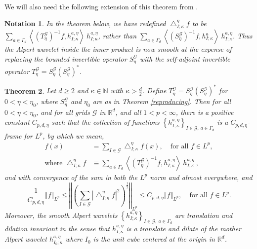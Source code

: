 \documentclass{amsart}%
\newtheorem{theorem}{Theorem}
\theoremstyle{plain}
\newtheorem{notation}[theorem]{Notation}
\numberwithin{equation}{section}
\begin{document}
We will also need the following extension of this theorem from \cite[Section
2]{Saw8}.

\begin{notation}
In the theorem below, we have \emph{redefined} $\bigtriangleup_{I;\kappa
}^{\eta}f$ to be $\sum_{a\in\Gamma_{d}}\left\langle \left(  T_{\eta
}^{\mathcal{G}}\right)  ^{-1}f,h_{I;\kappa}^{a,\eta}\right\rangle
\ h_{I;\kappa}^{a,\eta}$, rather than $\sum_{a\in\Gamma_{d}}\left\langle
\left(  S_{\eta}^{\mathcal{G}}\right)  ^{-1}f,h_{I;\kappa}^{a}\right\rangle
\ h_{I;\kappa}^{a,\eta}$. Thus the Alpert wavelet inside the inner product is
now smooth at the expense of replacing the bounded invertible operator
$S_{\eta}^{\mathcal{G}}$ with the self-adjoint invertible operator $T_{\eta
}^{\mathcal{G}}=S_{\eta}^{\mathcal{G}}\left(  S_{\eta}^{\mathcal{G}}\right)
^{\ast}$.
\end{notation}

\begin{theorem}
\label{reproducing'}Let $d\geq2$ and $\kappa\in\mathbb{N}$ with $\kappa
>\frac{d}{2}$. Define $T_{\eta}^{\mathcal{G}}=S_{\eta}^{\mathcal{G}}\left(
S_{\eta}^{\mathcal{G}}\right)  ^{\ast}$ for $0<\eta<\eta_{0}$, where $S_{\eta
}^{\mathcal{G}}$ and $\eta_{0}$ are as in Theorem \ref{reproducing}. Then for
all $0<\eta<\eta_{0}$, and for all grids $\mathcal{G}$ in $\mathbb{R}^{d} $,
and all $1<p<\infty$, there is a positive constant $C_{p,d,\eta}$ such that
the collection of functions $\left\{  h_{I;\kappa}^{a,\eta}\right\}
_{I\in\mathcal{G},\ a\in\Gamma_{d}}$ is a $C_{p,d,\eta}$-frame for $L^{p}$, by
which we mean,%
\begin{align}
f\left(  x\right)   &  =\sum_{I\in\mathcal{G}}\bigtriangleup_{I;\kappa}^{\eta
}f\left(  x\right)  ,\ \ \ \ \ \text{for all }f\in L^{p}%
,\label{bounded below'}\\
\text{where }\bigtriangleup_{I;\kappa}^{\eta}f  &  \equiv\sum_{a\in\Gamma_{d}%
}\left\langle \left(  T_{\eta}^{\mathcal{G}}\right)  ^{-1}f,h_{I;\kappa
}^{a,\eta}\right\rangle \ h_{I;\kappa}^{a,\eta}\ ,\nonumber
\end{align}
and with convergence of the sum in both the $L^{p}$ norm and almost
everywhere, and%
\begin{equation}
\frac{1}{C_{p,d,\eta}}\left\Vert f\right\Vert _{L^{p}}\leq\left\Vert \left(
\sum_{I\in\mathcal{G}}\left\vert \bigtriangleup_{I;\kappa}^{\eta}f\right\vert
^{2}\right)  ^{\frac{1}{2}}\right\Vert _{L^{p}}\leq C_{p,d,\eta}\left\Vert
f\right\Vert _{L^{p}},\ \ \ \ \ \text{for all }f\in L^{p}.\label{square est'}%
\end{equation}
Moreover, the smooth Alpert wavelets $\left\{  h_{I;\kappa}^{a,\eta}\right\}
_{I\in\mathcal{G},\ a\in\Gamma_{d}}$ are translation and dilation invariant in
the sense that $h_{I;\kappa}^{a,\eta}$ is a translate and dilate of the mother
Alpert wavelet $h_{I_{0};\kappa}^{a,\eta}$ where $I_{0}$ is the unit cube
centered at the origin in $\mathbb{R}^{d}$.
\end{theorem}
\end{document}
